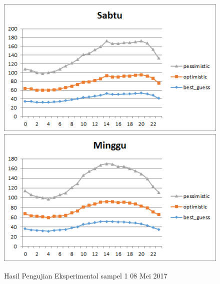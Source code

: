 \begin{figure}[H]
				\centering	
				\includegraphics[]{Gambar/sabtusampel108052017.png}
				\includegraphics[]{Gambar/minggusampel108052017.png}
				\caption[Hasil Pengujian Eksperimental]{Hasil Pengujian Eksperimental sampel 1 08 Mei 2017}
				\label{fig:eksperimentalsampel108052017}
\end{figure}

\newpage
				
